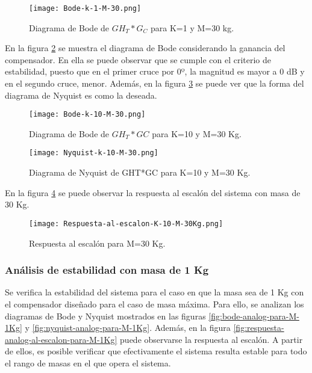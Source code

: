\begin{figure}[H]
	\centering
	\texttt{[image: Bode-k-1-M-30.png]}
	\caption{Diagrama de Bode de $GH_T*G_C$ para K=1 y M=30 kg.}
	\label{fig:bode-analog-compensado-para-k-1}
\end{figure}

\noindent En la figura \ref{fig:bode-analog-compensado-para-k-10} se muestra el diagrama de Bode considerando la ganancia del compensador. En ella se puede observar que se  cumple con el criterio de estabilidad, puesto que en el primer cruce por 0º, la magnitud es mayor a 0 dB y en el segundo cruce, menor. Adem\'{a}s, en la figura \ref{fig:nyquist-analog-para-k-10} se puede ver que la forma del diagrama de Nyquist es como la deseada.

\begin{figure}[H]
	\centering
	\texttt{[image: Bode-k-10-M-30.png]}
	\caption{Diagrama de Bode de $GH_{T}*GC$ para K=10 y M=30 Kg.}
	\label{fig:bode-analog-compensado-para-k-10}
\end{figure}

\begin{figure}[H]
	\centering
	\texttt{[image: Nyquist-k-10-M-30.png]}
	\caption{Diagrama de Nyquist de GHT*GC para K=10 y M=30 Kg.}
	\label{fig:nyquist-analog-para-k-10}
\end{figure}

\noindent En la figura \ref{fig:rta-escalon-k-10-m-30} se puede observar la respuesta al escalón del sistema con masa de 30 Kg.

\begin{figure}[H]
	\centering
	\texttt{[image: Respuesta-al-escalon-K-10-M-30Kg.png]}
	\caption{Respuesta al escalón para M=30 Kg.}
	\label{fig:rta-escalon-k-10-m-30}
\end{figure}

\subsubsection{Análisis de estabilidad con masa de 1 Kg}

\noindent Se verifica la estabilidad del sistema  para el caso en que la masa sea de 1 Kg con el compensador dise\~{n}ado para el caso de masa m\'{a}xima. Para ello, se analizan los diagramas de Bode y Nyquist mostrados en las figuras \ref{fig:bode-analog-para-M-1Kg} y \ref{fig:nyquist-analog-para-M-1Kg}. Adem\'{a}s, en la figura \ref{fig:respuesta-analog-al-escalon-para-M-1Kg} puede observarse la respuesta al escal\'{o}n. A partir de ellos, es posible verificar que efectivamente el sistema resulta estable para todo el rango de masas en el que opera el sistema. 


